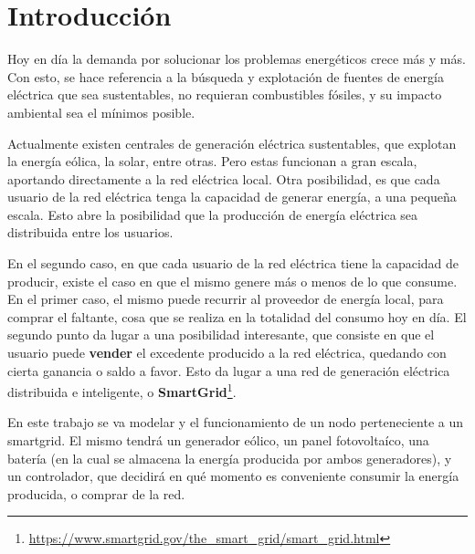 \section{Introducción} Hoy en día la demanda por solucionar los problemas
energéticos crece más y más. Con esto, se hace referencia a la búsqueda
y explotación de fuentes de energía eléctrica que sea sustentables, no
requieran combustibles fósiles, y su impacto ambiental sea el mínimos
posible.

Actualmente existen centrales de generación eléctrica sustentables, que
explotan la energía eólica, la solar, entre otras. Pero estas funcionan a
gran escala, aportando directamente a la red eléctrica local. Otra
posibilidad, es que cada usuario de la red eléctrica tenga la capacidad de
generar energía, a una pequeña escala. Esto abre la posibilidad que la
producción de energía eléctrica sea distribuida entre los usuarios.

En el segundo caso, en que cada usuario de la red eléctrica tiene la
capacidad de producir, existe el caso en que el mismo genere más o menos de
lo que consume. En el primer caso, el mismo puede recurrir al proveedor de
energía local, para comprar el faltante, cosa que se realiza en la totalidad
del consumo hoy en día. El segundo punto da lugar a una posibilidad
interesante, que consiste en que el usuario puede \textbf{vender} el
excedente producido a la red eléctrica, quedando con cierta ganancia o saldo
a favor. Esto da lugar a una red de generación eléctrica distribuida e
inteligente, o
\textbf{SmartGrid}\footnote{\url{https://www.smartgrid.gov/the_smart_grid/smart_grid.html}}.

En este trabajo se va modelar y el funcionamiento de un nodo perteneciente a
un smartgrid. El mismo tendrá un generador eólico, un panel fotovoltaíco, una
batería (en la cual se almacena la energía producida por ambos generadores),
y un controlador, que decidirá en qué momento es conveniente consumir la
energía producida, o comprar de la red.

